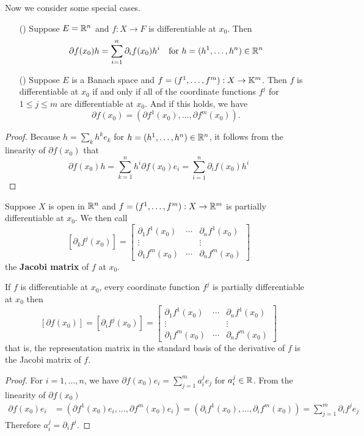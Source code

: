 \begin{theorem}\label{diff R^n}
Now we consider some special cases.
\begin{itemize}
\item[(\rmnum{1})] Suppose $E=\mathbb{R}^n$ and $f : X\to F$ is differentiable at $x_0$. Then
\[\partial f(x_0)h=\sum_{i=1}^{n}\partial_if(x_0)h^i\quad \text{for}\ h=(h^1,\dots,h^n)\in\R^n\]
\item[(\rmnum{2})] Suppose $E$ is a Banach space and $f=(f^1,\dots, f^m):X\to \mathbb{K}^m$. Then $f$ is differentiable at $x_0$ if and only if all of the coordinate functions $f^j$ for
$1\leq j \leq m$ are differentiable at $x_0$. And if this holds, we have
\[\partial f(x_0)=(\partial f^1(x_0),\dots,\partial f^m(x_0)).\]
\end{itemize}
\end{theorem}
\begin{proof}
Because $h=\sum_{k}h^ke_k$ for $h=(h^1,\dots,h^n)\in\mathbb{R}^n$, it follows from the linearity of $\partial f(x_0)$ that
\[\partial f(x_0)h=\sum_{k=1}^{n}h^i\partial f(x_0)e_i=\sum_{i=1}^{n}\partial_if(x_0)h^i\]
\end{proof}
\begin{definition}
Suppose $X$ is open in $\mathbb{R}^n$ and $f=(f^1,\dots,f^m):X\to \mathbb{R}^m$ is partially differentiable at $x_0$. We then call
\[[\partial_kf^j(x_0)]=\begin{bmatrix*}
\partial_1f^1(x_0) & \cdots & \partial_nf^1(x_0)\\
\vdots &  &\vdots\\
\partial_1f^m(x_0) &\cdots &\partial_nf^m(x_0)
\end{bmatrix*}\]
the \textbf{Jacobi matrix} of $f$ at $x_0$.
\end{definition}
\begin{corollary}
If $f$ is differentiable at $x_0$, every coordinate function $f^j$ is partially differentiable at $x_0$ then
\[[\partial f(x_0)]=[\partial_if^j(x_0)]=\begin{bmatrix*}
\partial_1f^1(x_0) & \cdots & \partial_nf^1(x_0)\\
\vdots &  &\vdots\\
\partial_1f^m(x_0) &\cdots &\partial_nf^m(x_0)
\end{bmatrix*}\]
that is, the representation matrix in the standard basis of the derivative of $f$ is the Jacobi matrix of $f$.
\end{corollary}
\begin{proof}
For $i=1,\dots,n$, we have $\partial f(x_0)e_i=\sum_{j=1}^{m}a_i^je_j$ for $a_i^j\in\mathbb{R}$. From the linearity of $\partial f(x_0)$
\begin{align*}
\partial f(x_0)e_i&=(\partial f^1(x_0)e_i,\dots,\partial f^m(x_0)e_i)=(\partial_i f^1(x_0),\dots,\partial_i f^m(x_0))=\sum_{j=1}^{m}\partial_i f^je_j
\end{align*}
Therefore $a_i^j=\partial_if^j$.
\end{proof}
